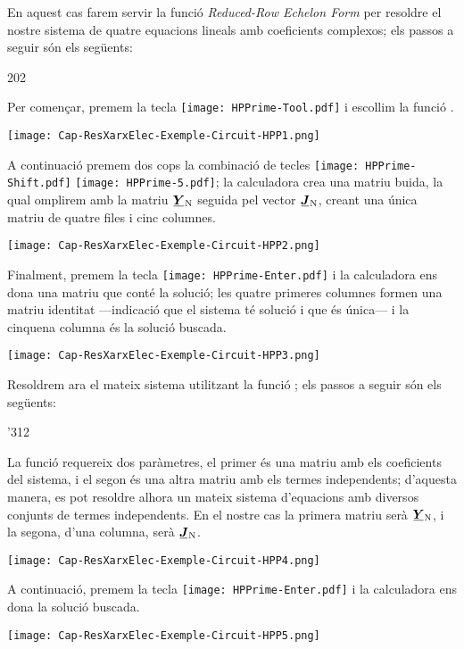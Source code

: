 \begin{exemple}
    En aquest cas farem servir la funció  \textit{Reduced-Row Echelon Form} per resoldre el nostre sistema de quatre equacions lineals amb coeficients complexos; els passos a seguir són els següents:

    \begin{dingautolist}{202}
         \item Per començar, premem la tecla \texttt{[image: HPPrime-Tool.pdf]} i escollim la funció .

             \texttt{[image: Cap-ResXarxElec-Exemple-Circuit-HPP1.png]}
         \item A continuació premem dos cops la combinació de tecles  \texttt{[image: HPPrime-Shift.pdf]} \texttt{[image: HPPrime-5.pdf]}; la calculadora crea una matriu buida, la qual omplirem amb la matriu $\mcmplx{Y}\ped{N}$ seguida pel vector $\mcmplx{J}\ped{N}$, creant una única matriu de quatre files i cinc columnes.

             \texttt{[image: Cap-ResXarxElec-Exemple-Circuit-HPP2.png]}

         \item Finalment, premem la tecla \texttt{[image: HPPrime-Enter.pdf]} i la calculadora ens dona una matriu que conté la solució; les quatre primeres columnes formen una matriu identitat ---indicació que el sistema té solució i que és única--- i la cinquena columna és la  solució buscada.

         \texttt{[image: Cap-ResXarxElec-Exemple-Circuit-HPP3.png]}
    \end{dingautolist}

    Resoldrem ara el mateix sistema utilitzant  la funció ; els passos a seguir són els següents:

    \begin{dingautolist}{'312}
         \item La funció  requereix dos paràmetres, el primer és una matriu amb els coeficients del sistema, i el segon és una altra matriu amb els termes independents; d'aquesta manera, es pot resoldre alhora un mateix sistema d'equacions amb diversos conjunts de termes independents. En el nostre cas la primera matriu serà $\mcmplx{Y}\ped{N}$, i la segona, d'una columna, serà  $\mcmplx{J}\ped{N}$.

             \texttt{[image: Cap-ResXarxElec-Exemple-Circuit-HPP4.png]}

         \item A continuació, premem la tecla \texttt{[image: HPPrime-Enter.pdf]} i la calculadora ens dona la  solució buscada.

         \texttt{[image: Cap-ResXarxElec-Exemple-Circuit-HPP5.png]}
    \end{dingautolist}
\end{exemple}



